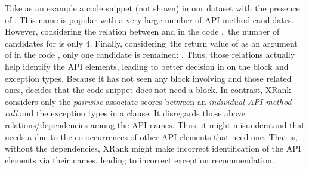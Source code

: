 Take as an example a code snippet (not shown) in our dataset with the
presence of . This name is popular with a very large number
of API method candidates.
However, considering the relation between  and
 in the code ,~the number
of candidates for  is only 4. Finally, considering~the
return value of  as an argument of
 in the code
, only one candidate is
remained:
.
Thus, those relations actually help identify the API elements,
leading to better decision in {\tool} on the  block
and exception types.
%
Because it has not seen any  block involving
 and those related ones, {\tool} decides
that the code snippet does not need a  block. In
contrast, XRank considers only the {\em pairwise} associate scores
between an {\em individual API method call} and the exception types
in a  clause. It disregards those above
relations/dependencies among the API names. Thus, it might
misunderstand that  needs a  due to the
co-occurrences of other API elements that need one. That is, without
the dependencies, XRank might make incorrect identification of the API
elements via their names, leading to incorrect exception
recommendation.



